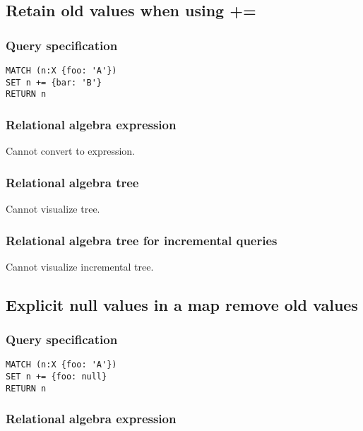 \subsection{Retain old values when using +=}

\subsubsection*{Query specification}

\begin{lstlisting}
MATCH (n:X {foo: 'A'})
SET n += {bar: 'B'}
RETURN n
\end{lstlisting}

\subsubsection*{Relational algebra expression}

Cannot convert to expression.

\subsubsection*{Relational algebra tree}

Cannot visualize tree.

\subsubsection*{Relational algebra tree for incremental queries}

Cannot visualize incremental tree.

\subsection{Explicit null values in a map remove old values}

\subsubsection*{Query specification}

\begin{lstlisting}
MATCH (n:X {foo: 'A'})
SET n += {foo: null}
RETURN n
\end{lstlisting}

\subsubsection*{Relational algebra expression}

